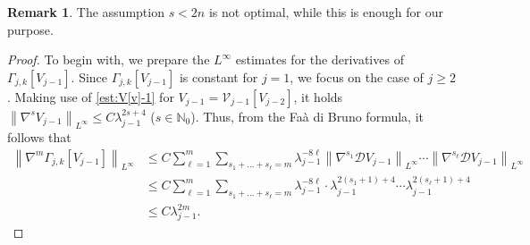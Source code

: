 \documentclass[a4paper,12pt,reqno]{amsart}
\theoremstyle{plain}
\theoremstyle{definition}
\newtheorem{rem}[thm]{Remark}
\renewcommand{\leq}{\leqslant}
\renewcommand{\geq}{\geqslant}
\newcommand{\n}[1]{{\left\|#1\right\|}}
\newcommand{\N}{\mathbb{N}}
\begin{document}
\begin{rem}
    The assumption $s<2n$ is not optimal, while this is enough for our purpose.
\end{rem}
\begin{proof}
To begin with, we prepare the $L^\infty$ estimates for the derivatives of $\Gamma_{j,k}[V_{j-1}]$.
Since $\Gamma_{j,k}[V_{j-1}]$ is constant for $j=1$, 
we focus on the case of $j \geq 2$.
Making use of \eqref{est:V[v]-1} for $V_{j-1}=\mathcal{V}_{j-1}[V_{j-2}]$, it holds
$\n{\nabla^s V_{j-1}}_{L^{\infty}} \leq C\lambda_{j-1}^{2s+4}$ ($s \in \N_0$).
Thus, from the Fa\`a di Bruno formula, it follows that
\begin{align}
    \n{\nabla^{m}\Gamma_{j,k}[V_{j-1}]}_{L^{\infty}}
    &\leq 
    C
    \sum_{\ell=1}^{m}
    \sum_{s_1+\dots+s_\ell=m}
    \lambda_{j-1}^{-8\ell}
    \n{\nabla^{s_1}\mathcal{D}V_{j-1}}_{L^{\infty}}
    \cdots
    \n{\nabla^{s_\ell}\mathcal{D}V_{j-1}}_{L^{\infty}}
    \\
    &
    \leq 
    C
    \sum_{\ell=1}^{m}
    \sum_{s_1+\dots+s_\ell=m}
    \lambda_{j-1}^{-8\ell}
    \cdot
    {\lambda_{j-1}^{2(s_1+1)+4}}
    \cdots
    {\lambda_{j-1}^{2(s_\ell+1)+4}}
    \\
    &
    \leq
    C\lambda_{j-1}^{2m}.
\end{align}







\end{proof}
\end{document}
